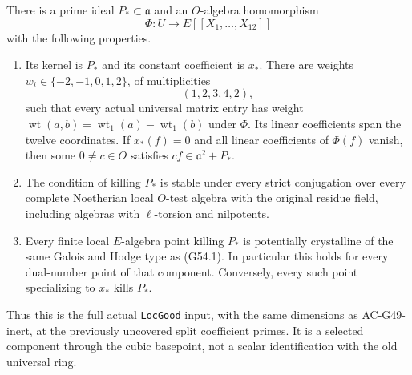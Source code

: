 \begin{theorem}
\label{AC-G54}
There is a prime ideal $P_*\subset\mathfrak a$ and an
$O$-algebra homomorphism
\[
       \Phi:U\longrightarrow E[[X_1,\ldots,X_{12}]]           \tag{G54.2}
\]
with the following properties.
\begin{enumerate}
\item Its kernel is $P_*$ and its constant coefficient is $x_*$.
There are weights $w_i\in\{-2,-1,0,1,2\}$, of multiplicities
\[
              (1,2,3,4,2),                                  \tag{G54.3}
\]
such that every actual universal matrix entry has weight
$\operatorname{wt}(a,b)=\operatorname{wt}_1(a)-
\operatorname{wt}_1(b)$ under $\Phi$.
Its linear coefficients span the twelve coordinates.
If $x_*(f)=0$ and all linear coefficients of $\Phi(f)$ vanish,
then some $0\ne c\in O$ satisfies
$cf\in\mathfrak a^2+P_*$.
\item The condition of killing $P_*$ is stable under every
strict conjugation over every complete Noetherian local
$O$-test algebra with the original residue field, including
algebras with $\ell$-torsion and nilpotents.
\item Every finite local $E$-algebra point killing $P_*$ is
potentially crystalline of the same Galois and Hodge type as
(G54.1).  In particular this holds for every dual-number point
of that component.  Conversely, every such point specializing
to $x_*$ kills $P_*$.
\end{enumerate}
Thus this is the full actual \texttt{LocGood} input, with the
same dimensions as AC-G49-inert, at the previously uncovered
split coefficient primes.  It is a selected component through
the cubic basepoint, not a scalar identification with the old
universal ring.
\end{theorem}
